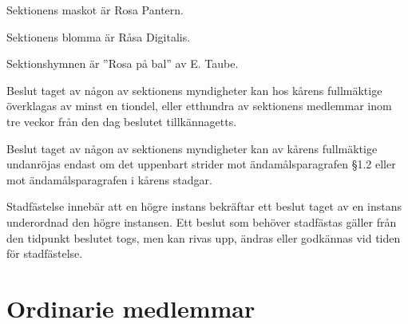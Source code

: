 \documentclass[stadgar]{dsekprotokoll}
\begin{document}
\begin{stadgeavsnitt}
Sektionens maskot är Rosa Pantern.


Sektionens blomma är Råsa Digitalis.


Sektionshymnen är ''Rosa på bal'' av E. Taube.


Beslut taget av någon av sektionens myndigheter kan hos kårens fullmäktige
överklagas av minst en tiondel, eller etthundra av sektionens medlemmar
inom tre veckor från den dag beslutet tillkännagetts.


Beslut taget av någon av sektionens myndigheter kan av kårens fullmäktige
undanröjas endast om det uppenbart strider mot ändamålsparagrafen \S1.2
eller mot ändamålsparagrafen i kårens stadgar.


Stadfästelse innebär att en högre instans bekräftar ett beslut taget av en instans underordnad den högre instansen. Ett beslut som behöver stadfästas gäller från den tidpunkt beslutet togs, men kan rivas upp, ändras eller godkännas vid tiden för stadfästelse.

\end{stadgeavsnitt}

\section{Ordinarie medlemmar}
\end{document}
